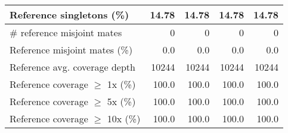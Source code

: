 \documentclass[12pt,a4paper]{article}
\begin{document}
\begin{table}[ht]
\begin{center}
\begin{tabular}{|l*{4}{|r}|}
Reference singletons (\%) & 14.78 & 14.78 & 14.78 & 14.78 \\ \hline
\# reference misjoint mates & 0 & 0 & 0 & 0 \\ \hline
Reference misjoint mates (\%) & 0.0 & 0.0 & 0.0 & 0.0 \\ \hline
Reference avg. coverage depth & 10244 & 10244 & 10244 & 10244 \\ \hline
Reference coverage $\geq$ 1x (\%) & 100.0 & 100.0 & 100.0 & 100.0 \\ \hline
Reference coverage $\geq$ 5x (\%) & 100.0 & 100.0 & 100.0 & 100.0 \\ \hline
Reference coverage $\geq$ 10x (\%) & 100.0 & 100.0 & 100.0 & 100.0 \\ \hline
\end{tabular}
\end{center}
\end{table}
\end{document}
